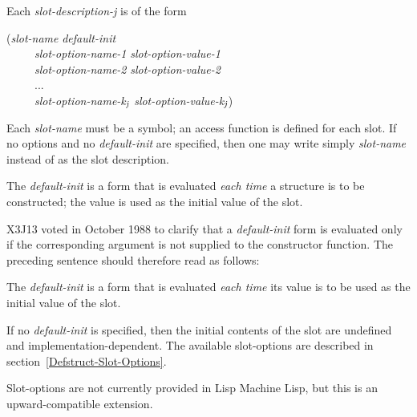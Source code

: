 \begin{defmac}
Each \emph{slot-description-j} is of the form
\begin{lisp}
(\emph{slot-name} \emph{default-init} \\
~~~~~\emph{slot-option-name-1} \emph{slot-option-value-1} \\
~~~~~\emph{slot-option-name-2} \emph{slot-option-value-2} \\
~~~~~... \\
~~~~~\emph{slot-option-name-k${}_{\hbox{\scriptsize\it j}}$} \emph{slot-option-value-k${}_{\hbox{\scriptsize\it j}}$})
\end{lisp}
Each \emph{slot-name} must be a symbol; an access function is defined
for each slot. If no options and no \emph{default-init} are specified,
then one may write simply \emph{slot-name} instead of 
as the slot description.

\begin{obsolete}
The \emph{default-init} is a form that is
evaluated \emph{each time} a structure is to be constructed; the value
is used as the initial value of the slot.
\end{obsolete}

\begin{newer}
X3J13 voted in October 1988 
to clarify that a \emph{default-init} form is evaluated only if the corresponding
argument is not supplied to the constructor function.  The preceding
sentence should therefore read as follows:

The \emph{default-init} is a form that is
evaluated \emph{each time} its value
is to be used as the initial value of the slot.
\end{newer}
If no \emph{default-init}
is specified, then the initial contents of the slot are undefined
and implementation-dependent.  The available slot-options are
described in section~\ref{Defstruct-Slot-Options}.

\beforenoterule
\begin{incompatibility}
Slot-options are not currently provided
in Lisp Machine Lisp, but this is an upward-compatible extension.
\end{incompatibility}
\afternoterule


\end{defmac}
